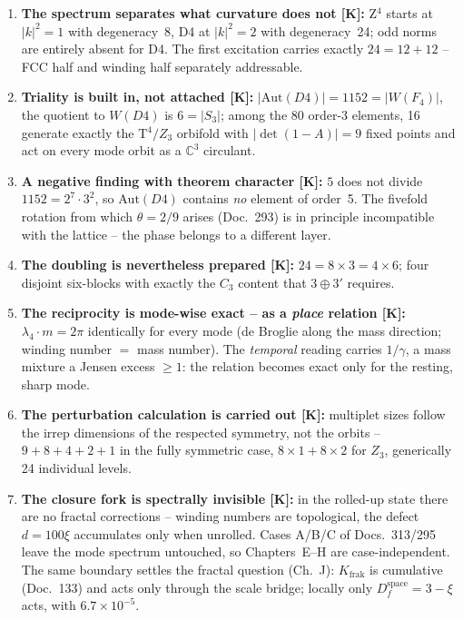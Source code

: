 \begin{enumerate}
  \item \textbf{The spectrum separates what curvature does not
        [K]:} Z$^4$ starts at $|k|^2 = 1$ with degeneracy~8, D4 at
        $|k|^2 = 2$ with degeneracy~24; odd norms are entirely
        absent for D4. The first excitation carries exactly
        $24 = 12+12$ -- FCC half and winding half separately
        addressable.
  \item \textbf{Triality is built in, not attached [K]:}
        $|\text{Aut}(D4)| = 1152 = |W(F_4)|$, the quotient to
        $W(D4)$ is $6 = |S_3|$; among the 80 order-3 elements, 16
        generate exactly the T$^4/Z_3$ orbifold with
        $|\det(1-A)| = 9$ fixed points and act on every mode orbit
        as a $\mathbb{C}^3$ circulant.
  \item \textbf{A negative finding with theorem character [K]:} $5$
        does not divide $1152 = 2^7\cdot3^2$, so $\text{Aut}(D4)$
        contains \emph{no} element of order~5. The fivefold rotation
        from which $\theta = 2/9$ arises (Doc.~293) is in principle
        incompatible with the lattice -- the phase belongs to a
        different layer.
  \item \textbf{The doubling is nevertheless prepared [K]:}
        $24 = 8\times3 = 4\times6$; four disjoint six-blocks with
        exactly the $C_3$ content that $3\oplus3'$ requires.
  \item \textbf{The reciprocity is mode-wise exact -- as a
        \emph{place} relation [K]:} $\lambda_4\cdot m = 2\pi$
        identically for every mode (de Broglie along the mass
        direction; winding number $=$ mass number). The
        \emph{temporal} reading carries $1/\gamma$, a mass mixture
        a Jensen excess $\ge1$: the relation becomes exact only
        for the resting, sharp mode.
  \item \textbf{The perturbation calculation is carried out [K]:}
        multiplet sizes follow the irrep dimensions of the
        respected symmetry, not the orbits -- $9+8+4+2+1$ in the
        fully symmetric case, $8\times1+8\times2$ for $Z_3$,
        generically 24 individual levels.
  \item \textbf{The closure fork is spectrally invisible [K]:} in
        the rolled-up state there are no fractal corrections --
        winding numbers are topological, the defect $d = 100\xi$
        accumulates only when unrolled. Cases A/B/C of
        Docs.~313/295 leave the mode spectrum untouched, so
        Chapters~E--H are case-independent. The same boundary
        settles the fractal question (Ch.~J): $K_\text{frak}$ is
        cumulative (Doc.~133) and acts only through the scale
        bridge; locally only $D_f^\text{space} = 3-\xi$ acts, with
        $6.7\times10^{-5}$.
\end{enumerate}

